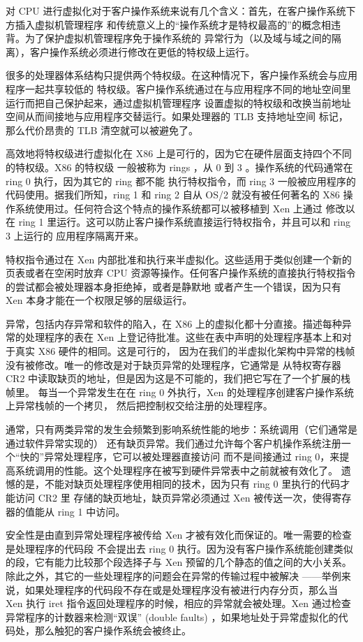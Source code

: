 对 CPU 进行虚拟化对于客户操作系统来说有几个含义：首先，在客户操作系统下方插入虚拟机管理程序
和传统意义上的“操作系统才是特权最高的”的概念相违背。为了保护虚拟机管理程序免于操作系统的
异常行为（以及域与域之间的隔离），客户操作系统必须进行修改在更低的特权级上运行。

很多的处理器体系结构只提供两个特权级。在这种情况下，客户操作系统会与应用程序一起共享较低的
特权级。客户操作系统通过在与应用程序不同的地址空间里运行而把自己保护起来，通过虚拟机管理程序
设置虚拟的特权级和改换当前地址空间从而间接地与应用程序交替运行。如果处理器的 TLB 支持地址空间
标记，那么代价昂贵的 TLB 清空就可以被避免了。

高效地将特权级进行虚拟化在 X86 上是可行的，因为它在硬件层面支持四个不同的特权级。X86 的特权级
一般被称为 rings ，从 0 到 3 。操作系统的代码通常在 ring 0 执行，因为其它的 ring 都不能
执行特权指令，而 ring 3 一般被应用程序的代码使用。据我们所知，ring 1 和 ring 2 自从 OS/2
就没有被任何著名的 X86 操作系统使用过。任何符合这个特点的操作系统都可以被移植到 Xen 上通过
修改以在 ring 1 里运行。这可以防止客户操作系统直接运行特权指令，并且可以和 ring 3 上运行的
应用程序隔离开来。

特权指令通过在 Xen 内部批准和执行来半虚拟化。这些适用于类似创建一个新的页表或者在空闲时放弃
CPU 资源等操作。任何客户操作系统的直接执行特权指令的尝试都会被处理器本身拒绝掉，或者是静默地
或者产生一个错误，因为只有 Xen 本身才能在一个权限足够的层级运行。

异常，包括内存异常和软件的陷入，在 X86 上的虚拟化都十分直接。描述每种异常的处理程序的表在
Xen 上登记待批准。这些在表中声明的处理程序基本上和对于真实 X86 硬件的相同。这是可行的，
因为在我们的半虚拟化架构中异常的栈帧没有被修改。唯一的修改是对于缺页异常的处理程序，它通常是
从特权寄存器 CR2 中读取缺页的地址，但是因为这是不可能的，我们把它写在了一个扩展的栈帧里。
每当一个异常发生在在 ring 0 外执行，Xen 的处理程序创建客户操作系统上异常栈帧的一个拷贝，
然后把控制权交给注册的处理程序。

通常，只有两类异常的发生会频繁到影响系统性能的地步：系统调用（它们通常是通过软件异常实现的）
还有缺页异常。我们通过允许每个客户机操作系统注册一个“快的”异常处理程序，它可以被处理器直接访问
而不是间接通过 ring 0，来提高系统调用的性能。这个处理程序在被写到硬件异常表中之前就被有效化了。
遗憾的是，不能对缺页处理程序使用相同的技术，因为只有 ring 0 里执行的代码才能访问 CR2 里
存储的缺页地址，缺页异常必须通过 Xen 被传送一次，使得寄存器的值能从 ring 1 中访问。

安全性是由直到异常处理程序被传给 Xen 才被有效化而保证的。唯一需要的检查是处理程序的代码段
不会提出去 ring 0 执行。因为没有客户操作系统能创建类似的段，它有能力比较那个段选择子与 Xen
预留的几个静态的值之间的大小关系。除此之外，其它的一些处理程序的问题会在异常的传输过程中被解决
——举例来说，如果处理程序的代码段不存在或是处理程序没有被进行内存分页，那么当 Xen 执行 iret
指令返回处理程序的时候，相应的异常就会被处理。Xen 通过检查异常程序的计数器来检测“双误”
(double faults) ，如果地址处于异常虚拟化的代码处，那么触犯的客户操作系统会被终止。

